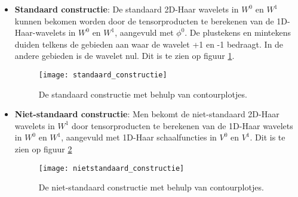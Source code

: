 \begin{enumerate}
	{\begin{itemize} 
		\item \textbf{Standaard constructie}:
		De standaard 2D-Haar wavelets in $W^0$ en $W^1$ kunnen bekomen worden door de tensorproducten te berekenen van de 1D-Haar-wavelets in $W^0$ en $W^1$, aangevuld met $\phi^0$. De plustekens en mintekens duiden telkens de gebieden aan waar de wavelet +1 en -1 bedraagt. In de andere gebieden is de wavelet nul. Dit is te zien op figuur \ref{fig:standaard_constructie}.
		\begin{figure}[ht]
			\centering
			\texttt{[image: standaard\_constructie]}
			\caption{De standaard constructie met behulp van contourplotjes.}
			\label{fig:standaard_constructie}
		\end{figure}
		\item \textbf{Niet-standaard constructie}: Men bekomt de niet-standaard 2D-Haar wavelets in $W^1$ door tensorproducten te berekenen van de 1D-Haar wavelets in $W^0$ en $W^1$, aangevuld met 1D-Haar schaalfuncties in $V^0$ en $V^1$. Dit is te zien op figuur \ref{fig:nietstandaard_constructie}
		\begin{figure}[ht]
			\centering
			\texttt{[image: nietstandaard\_constructie]}
			\caption{De niet-standaard constructie met behulp van contourplotjes.}
			\label{fig:nietstandaard_constructie}
		\end{figure}
	 \end{itemize}}
\end{enumerate}

